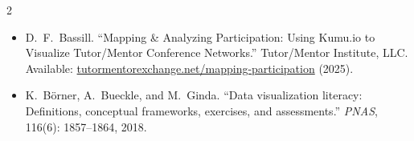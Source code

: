 \documentclass[11pt,letterpaper]{article}
\begin{document}
\begin{multicols}{2}
\begin{itemize}[leftmargin=*, label={}, itemsep=2pt]
  \item D.\ F.\ Bassill. ``Mapping \& Analyzing Participation: Using Kumu.io to
        Visualize Tutor/Mentor Conference Networks.'' Tutor/Mentor Institute,
        LLC. Available: \href{https://tutormentorexchange.net/mapping-participation}{tutormentorexchange.net/mapping-participation} (2025).

  \item K.\ B\"{o}rner, A.\ Bueckle, and M.\ Ginda. ``Data visualization
        literacy: Definitions, conceptual frameworks, exercises, and
        assessments.'' \textit{PNAS}, 116(6): 1857--1864, 2018.
\end{itemize}
\end{multicols}
\end{document}
